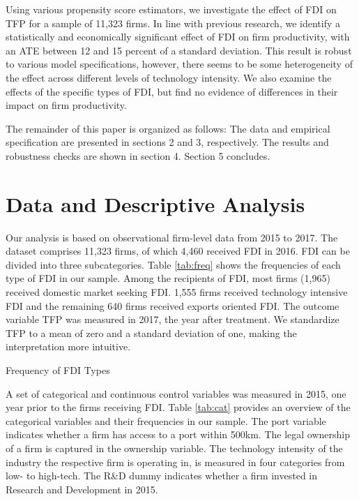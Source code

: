 \documentclass[a4paper,11pt]{scrartcl}
\begin{document}
Using various propensity score estimators, we investigate the effect of FDI on TFP for a sample of 11,323 firms. In line with previous research, we 
identify a statistically and economically significant effect of FDI on firm productivity, with an ATE between 12 and 15 percent of a standard deviation. This result is robust to various model specifications, however, there seems to be some heterogeneity of the effect across different levels of technology intensity. We also examine the effects of the specific types of FDI, but find no evidence of differences in their impact on firm productivity.

The remainder of this paper is organized as follows: The data and empirical specification are presented in sections 2 and 3, respectively. The results and robustness checks are shown in section 4. Section 5 concludes.

\section{Data and Descriptive Analysis}
Our analysis is based on observational firm-level data from 2015 to 2017. The dataset comprises 11,323 firms, of which 4,460 received FDI in 2016. FDI can be divided into three subcategories. Table \ref{tab:freq} shows the frequencies of each type of FDI in our sample. Among the recipients of FDI, most firms (1,965) received domestic market seeking FDI. 1,555 firms received technology intensive FDI and the remaining 640 firms received exports oriented FDI. The outcome variable TFP was measured in 2017, the year after treatment. 
We standardize TFP to a mean of zero and a standard deviation of one, making the interpretation more intuitive. 

\begin{table}[h!]
	\centering
	\caption{Frequency of FDI Types} 
	
\label{tab:freq}
\end{table}

A set of categorical and continuous control variables was measured in 2015, one year prior to the firms receiving FDI. Table \ref{tab:cat} provides an overview of the categorical variables and their frequencies in our sample. 
The port variable indicates whether a firm has access to a port within 500km. The legal ownership of a firm is captured in the ownership variable. The technology intensity of the industry the respective firm is operating in, is measured in four categories from low- to high-tech. The R\&D dummy indicates whether a firm  invested in Research and Development in 2015. \\
\end{document}
